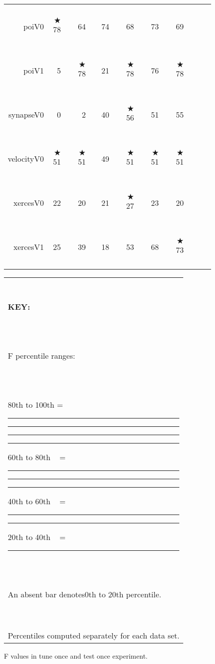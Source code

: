 \documentclass{acm_proc_article-sp}
\newcommand{\crule}[3][darkgray]{\textcolor{#1}{\rule{#2}{#3}}}
\newcommand{\rone}{\crule{1mm}{1.95mm}}
\newcommand{\rtwo}{\crule{1mm}{1.95mm}\hspace{0.3pt}\crule{1mm}{1.95mm}}
\newcommand{\rthree}{\crule{1mm}{1.95mm}\hspace{0.3pt}\crule{1mm}{1.95mm}\hspace{0.3pt}\crule{1mm}{1.95mm}}
\newcommand{\rfour}{\crule{1mm}{1.95mm}\hspace{0.3pt}\crule{1mm}{1.95mm}\hspace{0.3pt}\crule{1mm}{1.95mm}\hspace{0.3pt}\crule{1mm}{1.95mm}}
\begin{document}
\begin{figure*}
\begin{minipage}{0.81\linewidth}
\begin{tabular}{r@{~}|r@{~}l@{~}|r@{~}l@{~}|r@{~}l|r@{~}@{~}l|r@{~}l@{~}|r@{~}l@{~}|r@{~}l}
poiV0 & $\bigstar$78 & {\rfour} & 64 &         & 74 & {\rthree} & 68 & {\rone} & 73 & {\rthree} & 69 & {\rone}\\
poiV1 & 5 &         & $\bigstar$78 & {\rfour} & 21 & {\rone} & $\bigstar$78 & {\rfour} & 76 & {\rfour} & $\bigstar$78 & {\rfour}\\
synapseV0 & 0 &         & 2 &         & 40 & {\rthree} & $\bigstar$56 & {\rfour} & 51 & {\rfour} & 55 & {\rfour}\\
velocityV0 & $\bigstar$51 & {\rfour} & $\bigstar$51 & {\rfour} & 49 &         & $\bigstar$51 & {\rfour} & $\bigstar$51 & {\rfour} & $\bigstar$51 & {\rfour}\\
xercesV0 & 22 & {\rone} & 20 &         & 21 &         & $\bigstar$27 & {\rfour} & 23 & {\rtwo} & 20 &        \\
xercesV1 & 25 &         & 39 & {\rone} & 18 &         & 53 & {\rthree} & 68 & {\rfour} & $\bigstar$73 & {\rfour}\\
\end{tabular}
\end{minipage}\begin{minipage}{.15\linewidth}
\begin{tabular}{|p{\linewidth}|}\hline

~\\

{\bf KEY:}

~\\

F percentile ranges:

~\\

80th to 100th = {\rfour}

60th to 80th ~ = {\rthree}

40th to 60th  ~ = {\rtwo}

20th to 40th  ~ = {\rone}

~\\

An absent bar denotes\newline 0th to 20th percentile.

~\\

Percentiles computed  separately
for each data set.\\\hline
\end{tabular}
\end{minipage}
\caption{F values in tune once and test once experiment. 
}\label{fig:nonc}
\end{figure*}
\end{document}
